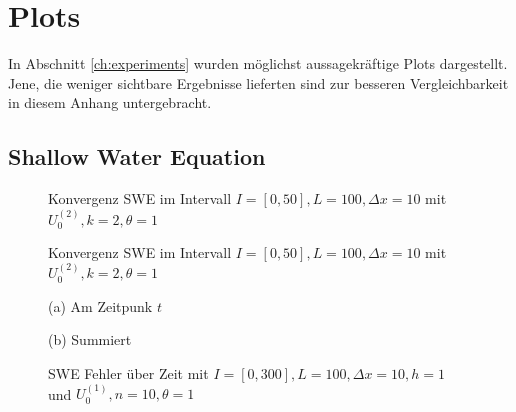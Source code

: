 \chapter{Plots}
 In Abschnitt \ref{ch:experiments} wurden möglichst aussagekräftige Plots dargestellt. Jene, die weniger sichtbare Ergebnisse lieferten sind zur besseren Vergleichbarkeit in diesem Anhang untergebracht.



\section{Shallow Water Equation}
\begin{figure}[H]
\centering

\caption{Konvergenz SWE im Intervall $I = [0,50], L=100, \Delta x=10$ mit $U_0^{(2)},k=2,\theta=1$}
\end{figure}

\begin{figure}[H]
\centering

\caption{Konvergenz SWE im Intervall $I = [0,50], L=100, \Delta x=10$ mit $U_0^{(2)},k=2,\theta=1$}
\end{figure}



\begin{figure}[H]
\footnotesize
\begin{minipage}[b]{0.49\linewidth}
\centering

\caption*{(a) Am Zeitpunk $t$}
\end{minipage}
\begin{minipage}[b]{0.49\linewidth}
\centering

\caption*{(b) Summiert}
\end{minipage}
\caption{SWE Fehler über Zeit mit $I=[0,300], L=100, \Delta x=10, h = 1$ und $U_0^{(1)},n=10,\theta=1$}
\end{figure}


